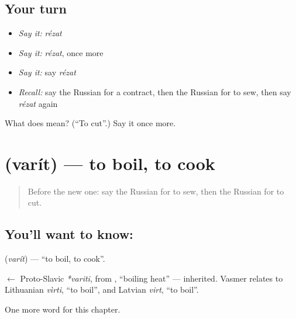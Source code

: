 \subsection*{Your turn}
\begin{itemize}
\raggedright
  \item \emph{Say it:} \emph{rézat}
  \item \emph{Say it:} \emph{rézat}, once more
  \item \emph{Say it:} say \emph{rézat}
  \item \emph{Recall:} say the Russian for a contract, then the Russian for to sew, then say \emph{rézat} again
\end{itemize}

\begin{tcolorbox}[breakable,colback=teal!4,colframe=teal!35!black,title={Before you move on}]
What does  mean? (\textquotedblleft{}To cut\textquotedblright{}.) Say it once more.
\end{tcolorbox}
\section[\texorpdfstring{\ru{варить} (varít)}{варить (varít)}]{ (varít) — to boil, to cook}

\label{lesson:RU-C173-varit}



\begin{quote}
Before the new one: say the Russian for to sew, then the Russian for to cut.
\end{quote}

\subsection*{You'll want to know: }
\textbf{} (\emph{varít}) — \textquotedblleft{}to boil, to cook\textquotedblright{}.

\begin{cousinweb}
\textbf{} $\leftarrow$ Proto-Slavic \emph{*variti}, from \emph{}, \textquotedblleft{}boiling heat\textquotedblright{} — inherited. Vasmer relates \emph{} to Lithuanian \emph{vìrti}, \textquotedblleft{}to boil\textquotedblright{}, and Latvian \emph{virt}, \textquotedblleft{}to boil\textquotedblright{}.
\end{cousinweb}

\begin{grammarlens}[title={What you've built}]
One more word for this chapter.
\end{grammarlens}

